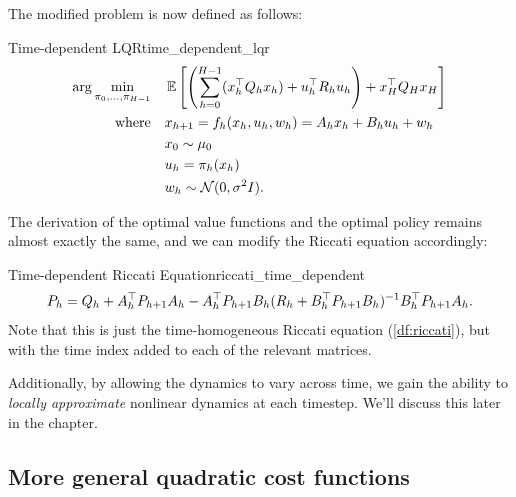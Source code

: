 \documentclass[../main/main]{subfiles}
\begin{document}
The modified problem is now defined as follows:

\begin{definition}{Time-dependent LQR}{time_dependent_lqr}
    \begin{align*}
        \arg \min_{\pi_{0}, \dots, \pi_{H-1}} \quad & \operatorname*{\mathbb{E}} \left[ \left( \sum_{h=0}^{H-1} (x_h^\top Q_h x_h) + u_h^\top R_h u_h \right) + x_H^\top Q_H x_H \right] \\
        \textrm{where} \quad & x_{h+1} = f_h(x_h, u_h, w_h) = A_h x_h + B_h u_h + w_h \\
        & x_0 \sim \mu_0 \\
        & u_h = \pi_h (x_h) \\
        & w_h \sim \mathcal{N}(0, \sigma^2 I).
    \end{align*}
\end{definition}

The derivation of the optimal value functions and the optimal policy remains almost exactly the same,
and we can modify the Riccati equation accordingly:

\begin{definition}{Time-dependent Riccati Equation}{riccati_time_dependent}
    \[
        P_h = Q_h + A_h^\top P_{h+1} A_h - A_h^\top P_{h+1} B_h (R_h + B_h^\top P_{h+1} B_h)^{-1} B_h^\top P_{h+1} A_h.
    \]
    Note that this is just the time-homogeneous Riccati equation (\autoref{df:riccati}),
    but with the
    time index added to each of the relevant matrices.
\end{definition}

Additionally, by allowing the dynamics to vary across time,
we gain the ability to \emph{locally approximate} nonlinear dynamics at each timestep.
We'll discuss this later in the chapter.

\subsection[General quadratic cost]{More general quadratic cost functions}
\end{document}
